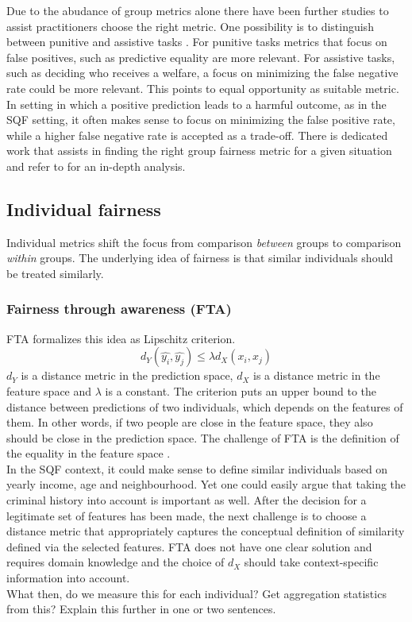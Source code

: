 Due to the abudance of group metrics alone there have been further studies to assist practitioners choose the right metric. One possibility is to distinguish between punitive and assistive tasks \cite{lane}. For punitive tasks metrics that focus on false positives, such as predictive equality are more relevant. For assistive tasks, such as deciding who receives a welfare, a focus on minimizing the false negative rate could be more relevant. This points to equal opportunity as suitable metric.
In setting in which a positive prediction leads to a harmful outcome, as in the SQF setting, it often makes sense to focus on minimizing the false positive rate, while a higher false negative rate is accepted as a trade-off.
There is dedicated work that assists in finding the right group fairness metric for a given situation and refer to \cite{makhlouf2021} for an in-depth analysis.

\subsection{Individual fairness}
Individual metrics shift the focus from comparison \textit{between} groups to comparison \textit{within} groups. The underlying idea of fairness is that similar individuals should be treated similarly.

\subsubsection*{Fairness through awareness (FTA)}
FTA formalizes this idea as Lipschitz criterion. $$d_Y(\hat{y_i}, \hat{y_j}) \leq \lambda {d_X}(x_i, x_j)$$
$d_Y$ is a distance metric in the prediction space, $d_X$ is a distance metric in the feature space and $\lambda$ is a constant.
The criterion puts an upper bound to the distance between predictions of two individuals, which depends on the features of them. In other words, if two people are close in the feature space, they also should be close in the prediction space. The challenge of FTA is the definition of the equality in the feature space \cite{castelnovo2022}.\\
In the SQF context, it could make sense to define similar individuals based on yearly income, age and neighbourhood.
Yet one could easily argue that taking the criminal history into account is important as well. After the decision for a legitimate set of features has been made, the next challenge is to choose a distance metric that appropriately captures the conceptual definition of similarity defined via the selected features.
FTA does not have one clear solution and requires domain knowledge and the choice of $d_X$ should take context-specific information into account.\\
What then, do we measure this for each individual? Get aggregation statistics from this? Explain this further in one or two sentences.

